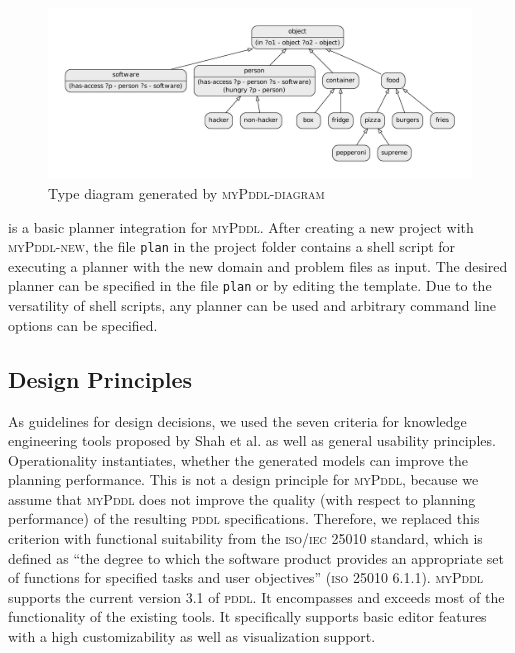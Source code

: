 \documentclass[runningheads]{llncs}
\newcommand{\mypddl}{\textsc{myPddl}\xspace}
\newcommand{\mypddldiagram}{\textsc{myPddl-diagram}\xspace}
\newcommand{\mypddlnew}{\textsc{myPddl-new}\xspace}
\newcommand{\mypddlplan}{\textsc{myPddl-plan}\xspace}
\newcommand{\pddl}{\textsc{pddl}\xspace}
\begin{document}
\begin{description}
  \begin{figure}
    \centering
    \includegraphics[width=1\textwidth]{dot-diagram}
    \caption{Type diagram generated by \mypddldiagram}
    \label{fig:diagram}
  \end{figure}

\item[\mypddlplan] is a basic planner integration for \mypddl. After
  creating a new project with \mypddlnew, the file \texttt{plan} in
  the project folder contains a shell script for executing a planner
  with the new domain and problem files as input. The desired planner
  can be specified in the file \texttt{plan} or by editing the
  template. Due to the versatility of shell scripts, any planner can
  be used and arbitrary command line options can be specified.

\end{description}

\subsection{Design Principles}

As guidelines for design decisions, we used the seven criteria for
knowledge engineering tools proposed by Shah et
al. \cite{shah2013knowledge} as well as general usability
principles. Operationality instantiates, whether the generated models
can improve the planning performance. This is not a design principle
for \mypddl, because we assume that \mypddl does not improve the
quality (with respect to planning performance) of the resulting \pddl
specifications. Therefore, we replaced this criterion with functional
suitability from the \textsc{iso/iec} 25010 standard, which is defined
as “the degree to which the software product provides an appropriate
set of functions for specified tasks and user objectives”
(\textsc{iso} 25010 6.1.1). \mypddl supports the current version 3.1
of \pddl. It encompasses and exceeds most of the functionality of the
existing tools. It specifically supports basic editor features with a
high customizability as well as visualization support.
\end{document}
